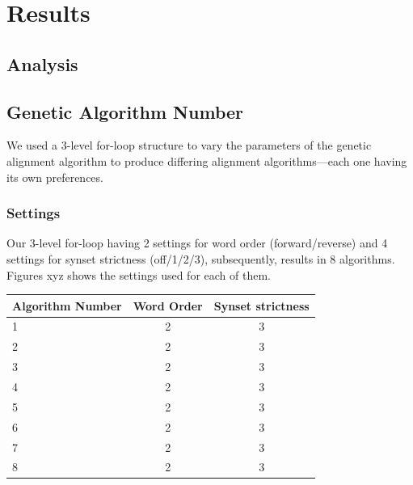 \section {Results}
\label{results}

\subsection {Analysis} 

\subsection{Genetic Algorithm Number}%
We used a 3-level for-loop structure to vary the parameters of the genetic alignment algorithm to produce differing alignment algorithms---each one having its own preferences. 

\subsubsection{Settings}
Our 3-level for-loop having 2 settings for word order (forward/reverse) and 4 settings for synset strictness (off/1/2/3), subsequently, results in 8 algorithms. Figures xyz %
shows the settings used for each of them.%


\begin{tabular} {|l | c | c |}
	\hline	\textbf{Algorithm Number} & \textbf{Word Order} & \textbf{Synset strictness}\\
	\hline	1	&	2	&	3	\\
	\hline	2	&	2	&	3	\\
	\hline	3	&	2	&	3	\\
	\hline	4	&	2	&	3	\\
	\hline	5	&	2	&	3	\\
	\hline	6	&	2	&	3	\\
	\hline	7	&	2	&	3	\\
	\hline	8	&	2	&	3	\\ \hline
\end{tabular}

